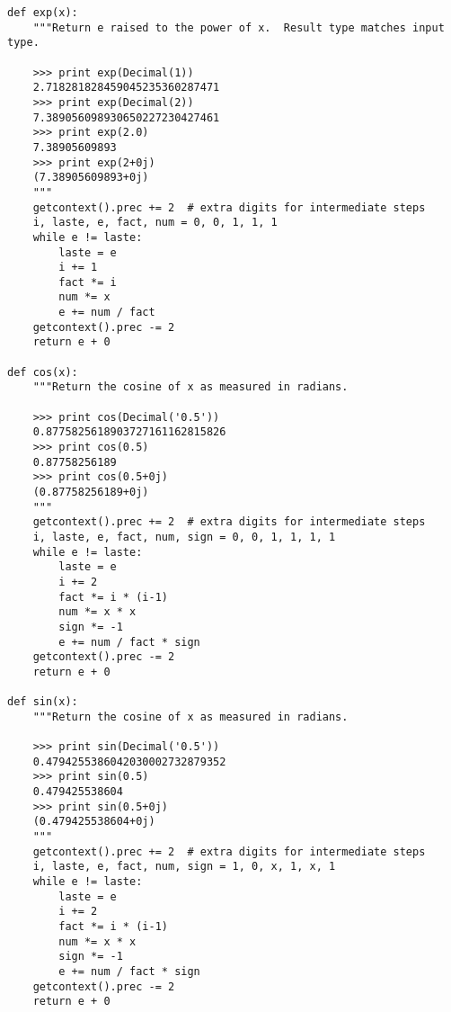 \begin{verbatim}
def exp(x):
    """Return e raised to the power of x.  Result type matches input type.

    >>> print exp(Decimal(1))
    2.718281828459045235360287471
    >>> print exp(Decimal(2))
    7.389056098930650227230427461
    >>> print exp(2.0)
    7.38905609893
    >>> print exp(2+0j)
    (7.38905609893+0j)
    """
    getcontext().prec += 2  # extra digits for intermediate steps
    i, laste, e, fact, num = 0, 0, 1, 1, 1
    while e != laste:
        laste = e    
        i += 1
        fact *= i
        num *= x     
        e += num / fact   
    getcontext().prec -= 2        
    return e + 0

def cos(x):
    """Return the cosine of x as measured in radians.

    >>> print cos(Decimal('0.5'))
    0.8775825618903727161162815826
    >>> print cos(0.5)
    0.87758256189
    >>> print cos(0.5+0j)
    (0.87758256189+0j)
    """
    getcontext().prec += 2  # extra digits for intermediate steps
    i, laste, e, fact, num, sign = 0, 0, 1, 1, 1, 1
    while e != laste:
        laste = e    
        i += 2
        fact *= i * (i-1)
        num *= x * x
        sign *= -1
        e += num / fact * sign 
    getcontext().prec -= 2        
    return e + 0

def sin(x):
    """Return the cosine of x as measured in radians.

    >>> print sin(Decimal('0.5'))
    0.4794255386042030002732879352
    >>> print sin(0.5)
    0.479425538604
    >>> print sin(0.5+0j)
    (0.479425538604+0j)
    """
    getcontext().prec += 2  # extra digits for intermediate steps
    i, laste, e, fact, num, sign = 1, 0, x, 1, x, 1
    while e != laste:
        laste = e    
        i += 2
        fact *= i * (i-1)
        num *= x * x
        sign *= -1
        e += num / fact * sign 
    getcontext().prec -= 2        
    return e + 0

\end{verbatim}                                             
